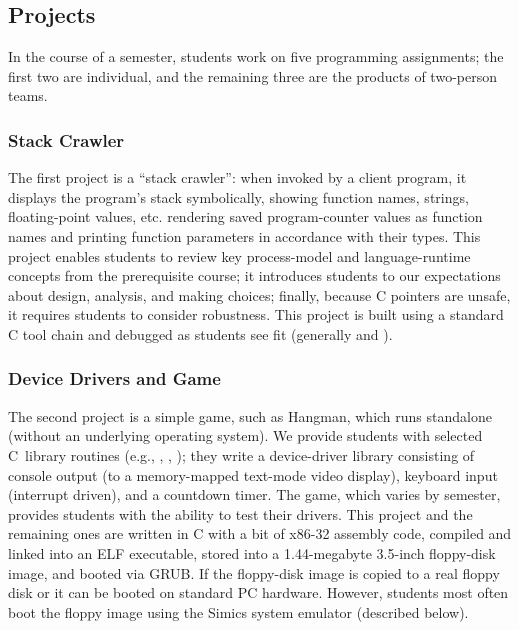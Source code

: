 \subsection{Projects}

In the course of a semester, students work on five
programming assignments; the first two are individual,
and the remaining three are the products of two-person
teams.

\subsubsection{Stack Crawler}
The first project is a ``stack crawler'':  when invoked by
a client program, it displays the program's stack
symbolically,
\shortversion
{showing function names, strings, floating-point values, etc.}
{rendering saved program-counter values
as function names and printing function parameters
in accordance with their types.}
This project
enables students to review key process-model and
language-runtime concepts from the
prerequisite course;
it introduces students to our expectations about
design, analysis, and making choices;
finally,
because C pointers are unsafe, it requires students
to consider robustness.
%
This project is built using a standard C tool chain
and debugged as students see fit (generally
 and ).

\subsubsection{Device Drivers and Game}
The second project is a simple game, such as Hangman,
which runs standalone (without an underlying
operating system).
We provide students with selected C~library routines
(e.g., , , );
they write a device-driver library consisting of
console output (to a memory-mapped text-mode video display),
keyboard input (interrupt driven),
and a countdown timer.
The game, which varies by semester, provides students
with the ability to test their drivers.
%
%
This project and the remaining ones are written in
C with a bit of x86-32 assembly code,
compiled and linked into an ELF executable,
stored into a 1.44-megabyte 3.5-inch floppy-disk image,
and booted via GRUB.
If the floppy-disk image is copied to a real floppy disk
or 
it can be booted on standard PC hardware.
However, students most often boot the floppy image
using the Simics system emulator (described below).

